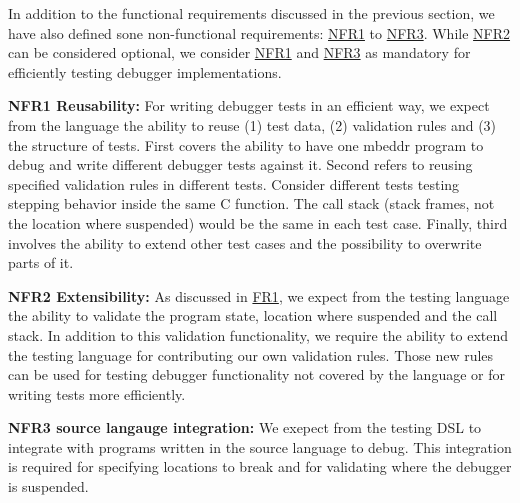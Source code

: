In addition to the functional requirements discussed in the previous section, we
have also defined sone non-functional requirements: \hyperref[NFR1]{NFR1} to
\hyperref[NFR3]{NFR3}. While \hyperref[NFR2]{NFR2} can be considered optional,
we consider \hyperref[NFR1]{NFR1} and \hyperref[NFR3]{NFR3} as mandatory 
for efficiently testing debugger implementations.

\noindent \textbf{\label{NFR1}NFR1 Reusability:} For writing debugger tests in
an efficient way, we expect from the language the ability to reuse (1) test data, (2) 
validation rules and (3) the structure of tests. First covers the ability to
have one mbeddr program to debug and write different debugger tests against
it. Second refers to reusing specified validation rules in different tests.
Consider different tests testing stepping behavior inside the same C function.
The call stack (stack frames, not the location where suspended) would be the
same in each test case. Finally, third involves the ability to extend other test
cases and the possibility to overwrite parts of it. 
 

\noindent \textbf{\label{NFR2}NFR2 Extensibility:} As discussed in
\hyperref[FR1]{FR1}, 
we expect from the testing language the ability to validate the program state, location where
suspended and the call stack. In addition to this validation functionality, we
require the ability to extend the testing language for contributing our own
validation rules. Those new rules can be used for testing debugger
functionality not covered by the language or for writing tests more efficiently.

\noindent \textbf{\label{NFR3}NFR3 source langauge integration:} We exepect from
the testing \ac{DSL} to integrate with programs written in the source language to debug.
This integration is required for specifying locations to break and for
validating where the debugger is suspended.
